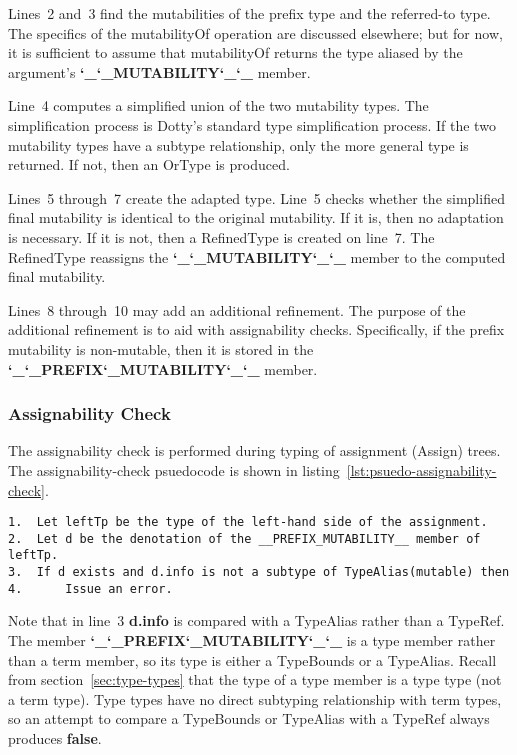 \documentclass[11pt]{report}
\newcommand{\und}{\char`_}
\newcommand{\MUTABILITY}{\und\und MUTABILITY\und\und }
\newcommand{\PREFIXMUTABILITY}{\und\und PREFIX\und MUTABILITY\und\und }
\newcommand{\cdf}{\bf\ttfamily} %
\newcommand{\cde}{\cdf\footnotesize}  %
\newcommand{\cd}{\cdf\small}  %
\begin{document}
Lines~2 and~3 find the mutabilities of the prefix type and the referred-to type. The specifics of the mutabilityOf operation are discussed elsewhere; but for now, it is sufficient to assume that mutabilityOf returns the type aliased by the argument's {\cd \MUTABILITY} member.

Line~4 computes a simplified union of the two mutability types. The simplification process is Dotty's standard type simplification process. If the two mutability types have a subtype relationship, only the more general type is returned. If not, then an OrType is produced.

Lines~5 through~7 create the adapted type. Line~5 checks whether the simplified final mutability is identical to the original mutability. If it is, then no adaptation is necessary. If it is not, then a RefinedType is created on line~7. The RefinedType reassigns the {\cd \MUTABILITY} member to the computed final mutability.

Lines~8 through~10 may add an additional refinement. The purpose of the additional refinement is to aid with assignability checks. Specifically, if the prefix mutability is non-mutable, then it is stored in the {\cd \PREFIXMUTABILITY} member.

\subsubsection{Assignability Check}

The assignability check is performed during typing of assignment (Assign) trees. The assignability-check psuedocode is shown in listing~\ref{lst:psuedo-assignability-check}.

\begin{lstlisting}[float=htbp, caption={Psuedocode for Assignability Checking}, language={PsuedoCode}, emphstyle={\cde\color{Black}}, label={lst:psuedo-assignability-check}]
1.  Let leftTp be the type of the left-hand side of the assignment.
2.  Let d be the denotation of the __PREFIX_MUTABILITY__ member of leftTp.
3.  If d exists and d.info is not a subtype of TypeAlias(mutable) then
4.      Issue an error.
\end{lstlisting}

Note that in line~3 {\cd d.info} is compared with a TypeAlias rather than a TypeRef. The member {\cd \PREFIXMUTABILITY} is a type member rather than a term member, so its type is either a TypeBounds or a TypeAlias. Recall from section~\ref{sec:type-types} that the type of a type member is a type type (not a term type). Type types have no direct subtyping relationship with term types, so an attempt to compare a TypeBounds or TypeAlias with a TypeRef always produces {\cd false}.
\end{document}

